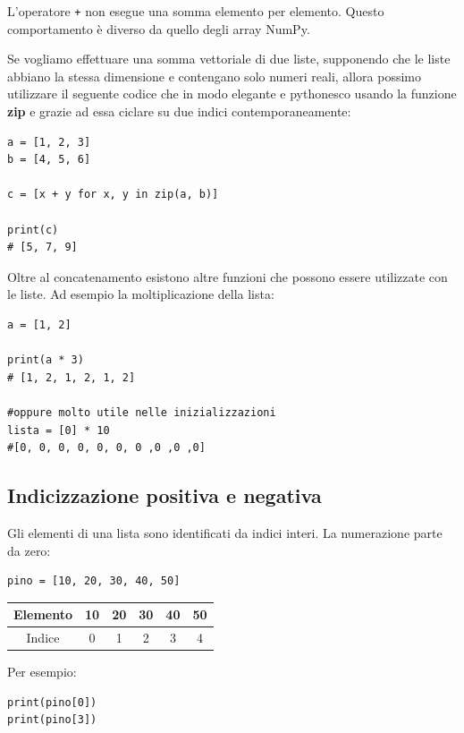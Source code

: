 \documentclass[11pt,a4paper]{book}
\begin{document}
L'operatore \texttt{+} non esegue una somma elemento per elemento. Questo comportamento è diverso da quello degli array NumPy.

Se vogliamo effettuare una somma vettoriale di due liste, supponendo che le liste abbiano la stessa dimensione e contengano solo numeri reali, allora possimo utilizzare il seguente codice che in modo elegante e pythonesco usando la funzione \textbf{zip} e grazie ad essa ciclare su due indici contemporaneamente:
\begin{lstlisting}[style=python, numbers=none]
a = [1, 2, 3]
b = [4, 5, 6]

c = [x + y for x, y in zip(a, b)]

print(c)
# [5, 7, 9]
\end{lstlisting}

Oltre al concatenamento esistono altre funzioni che possono essere utilizzate con le liste. Ad esempio la moltiplicazione della lista:
\begin{lstlisting}[style=python, numbers=none]
a = [1, 2]

print(a * 3)
# [1, 2, 1, 2, 1, 2]

#oppure molto utile nelle inizializzazioni
lista = [0] * 10
#[0, 0, 0, 0, 0, 0, 0 ,0 ,0 ,0]
\end{lstlisting}

\subsection{Indicizzazione positiva e negativa}

Gli elementi di una lista sono identificati da indici interi. La numerazione parte da zero:

\begin{lstlisting}[style=python]
pino = [10, 20, 30, 40, 50]
\end{lstlisting}

\begin{center}
\begin{tabular}{c|ccccc}
\toprule
Elemento & 10 & 20 & 30 & 40 & 50 \\
\midrule
Indice & 0 & 1 & 2 & 3 & 4 \\
\bottomrule
\end{tabular}
\end{center}

Per esempio:

\begin{lstlisting}[style=python]
print(pino[0])
print(pino[3])
\end{lstlisting}
\end{document}
